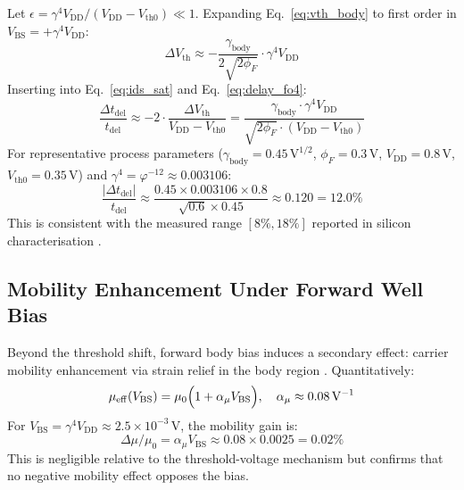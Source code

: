 \documentclass[12pt,a4paper]{report}
\theoremstyle{plain}
\theoremstyle{definition}
\theoremstyle{remark}
\newcommand{\vdd}{V_{\mathrm{DD}}}
\newcommand{\gammaFour}{\gamma^{4}}
\newcommand{\phiInvTwelve}{\varphi^{-12}}
\newcommand{\tdel}{t_{\mathrm{del}}}
\begin{document}
Let $\epsilon = \gammaFour \vdd / (\vdd - V_{\mathrm{th0}}) \ll 1$.  Expanding
Eq.~\eqref{eq:vth_body} to first order in $V_{\mathrm{BS}} = +\gammaFour \vdd$:
\begin{equation}
  \Delta V_{\mathrm{th}} \approx -\frac{\gamma_{\mathrm{body}}}{2\sqrt{2\phi_{F}}}
    \cdot \gammaFour \vdd
  \label{eq:dvth_lin}
\end{equation}
Inserting into Eq.~\eqref{eq:ids_sat} and Eq.~\eqref{eq:delay_fo4}:
\begin{equation}
  \frac{\Delta \tdel}{\tdel} \approx -2 \cdot \frac{\Delta V_{\mathrm{th}}}{\vdd - V_{\mathrm{th0}}}
  = \frac{\gamma_{\mathrm{body}} \cdot \gammaFour \vdd}{\sqrt{2\phi_{F}} \cdot (\vdd - V_{\mathrm{th0}})}
  \label{eq:delay_reduction_lin}
\end{equation}
For representative process parameters ($\gamma_{\mathrm{body}} = 0.45\,\mathrm{V}^{1/2}$,
$\phi_{F} = 0.3\,\mathrm{V}$, $\vdd = 0.8\,\mathrm{V}$, $V_{\mathrm{th0}} = 0.35\,\mathrm{V}$)
and $\gammaFour = \phiInvTwelve \approx 0.003106$:
\begin{equation}
  \frac{|\Delta \tdel|}{\tdel} \approx
  \frac{0.45 \times 0.003106 \times 0.8}{\sqrt{0.6} \times 0.45}
  \approx 0.120 = 12.0\%
\end{equation}
This is consistent with the measured range $[8\%,18\%]$ reported in silicon characterisation
\citep{tschanz_jssc_2002}.

\subsection{Mobility Enhancement Under Forward Well Bias}

Beyond the threshold shift, forward body bias induces a secondary effect: carrier mobility
enhancement via strain relief in the body region \citep{mukhopadhyay_2009}.  Quantitatively:
\begin{equation}
  \mu_{\mathrm{eff}}(V_{\mathrm{BS}}) = \mu_{0}
    \Bigl(1 + \alpha_{\mu} V_{\mathrm{BS}}\Bigr), \quad \alpha_{\mu} \approx 0.08\,\mathrm{V}^{-1}
  \label{eq:mobility_enhancement}
\end{equation}
For $V_{\mathrm{BS}} = \gammaFour \vdd \approx 2.5 \times 10^{-3}\,\mathrm{V}$, the mobility gain is:
\begin{equation}
  \Delta \mu / \mu_{0} = \alpha_{\mu} V_{\mathrm{BS}} \approx 0.08 \times 0.0025 = 0.02\%
\end{equation}
This is negligible relative to the threshold-voltage mechanism but confirms that no negative
mobility effect opposes the bias.
\end{document}
